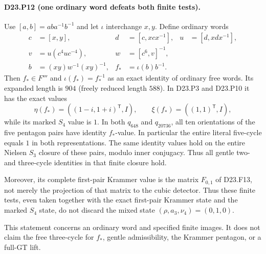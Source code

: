 \paragraph{D23.P12 (one ordinary word defeats both finite tests).}
Use $[a,b]=aba^{-1}b^{-1}$ and let $\iota$ interchange $x,y$.
Define ordinary words
\[
\begin{aligned}
 c&=[x,y],&d&=[c,xcx^{-1}],&u&=[d,xdx^{-1}],\\
 v&=u(c^4uc^{-4}),&w&=[c^6,v]^{-1},\\
 b&=(xy)w^{-1}(xy)^{-1},& f_*&=\iota(b)b^{-1}.
\end{aligned}
\tag{D23.P12.1}
\]
Then $f_*\in F'''$ and $\iota(f_*)=f_*^{-1}$ as an exact
identity of ordinary free words. Its expanded length is $904$
(freely reduced length $588$). In D23.P3 and D23.P10 it has
the exact values
\[
 \eta(f_*)=((1-i,1+i)^{\mathsf T},I),\qquad
 \xi(f_*)=((1,1)^{\mathsf T},I),
\tag{D23.P12.2}
\]
while its marked $S_4$ value is $1$. In both $q_{648}$ and
$q_{20736}$, all ten orientations of the five pentagon pairs
have identity $f_*$-value. In particular the entire literal
five-cycle equals $1$ in both representations.
The same identity values hold on the entire Nielsen $S_3$
closure of these pairs, modulo inner conjugacy. Thus all gentle
two- and three-cycle identities in that finite closure hold.

Moreover, its complete first-pair Krammer value is the matrix
$F_{0,1}$ of D23.F13, not merely the projection of that matrix
to the cubic detector. Thus these finite tests, even taken
together with the exact first-pair Krammer state and the marked
$S_4$ state, do not discard the mixed state
$(\rho,a_3,\nu_4)=(0,1,0)$.

This statement concerns an ordinary word and specified finite
images. It does not claim the free three-cycle for $f_*$,
gentle admissibility, the Krammer pentagon, or a full-GT lift.

